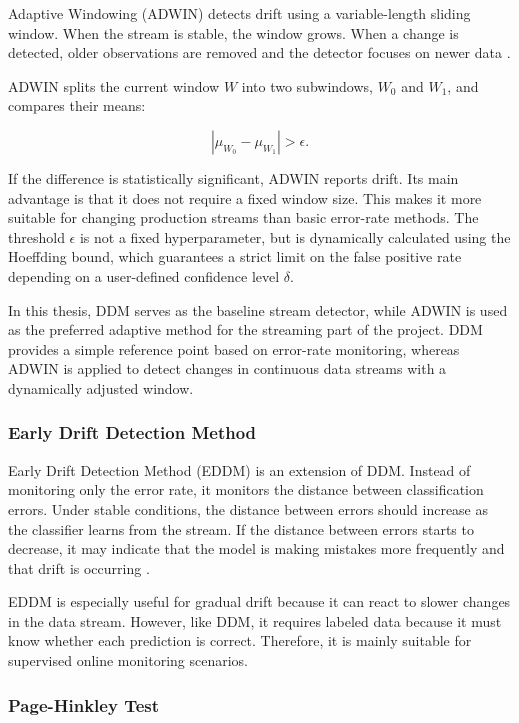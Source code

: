 Adaptive Windowing (ADWIN) detects drift using a variable-length sliding window. When the stream is stable, the window grows. When a change is detected, older observations are removed and the detector focuses on newer data \cite{RiverADWIN}.

ADWIN splits the current window $W$ into two subwindows, $W_0$ and $W_1$, and compares their means:

\begin{equation}
|\mu_{W_0} - \mu_{W_1}| > \epsilon.
\end{equation}

If the difference is statistically significant, ADWIN reports drift. Its main advantage is that it does not require a fixed window size. This makes it more suitable for changing production streams than basic error-rate methods.
The threshold $\epsilon$ is not a fixed hyperparameter, but is dynamically calculated using the Hoeffding bound, which guarantees a strict limit on the false positive rate depending on a user-defined confidence level $\delta$.

In this thesis, DDM serves as the baseline stream detector, while ADWIN is used as the preferred adaptive method for the streaming part of the project. DDM provides a simple reference point based on error-rate monitoring, whereas ADWIN is applied to detect changes in continuous data streams with a dynamically adjusted window.

\subsubsection{Early Drift Detection Method}

Early Drift Detection Method (EDDM) is an extension of DDM. Instead of monitoring only the error rate, it monitors the distance between classification errors. Under stable conditions, the distance between errors should increase as the classifier learns from the stream. If the distance between errors starts to decrease, it may indicate that the model is making mistakes more frequently and that drift is occurring \cite{ComparativeConceptDriftDetectors}.

EDDM is especially useful for gradual drift because it can react to slower changes in the data stream. However, like DDM, it requires labeled data because it must know whether each prediction is correct. Therefore, it is mainly suitable for supervised online monitoring scenarios.

\subsubsection{Page-Hinkley Test}


